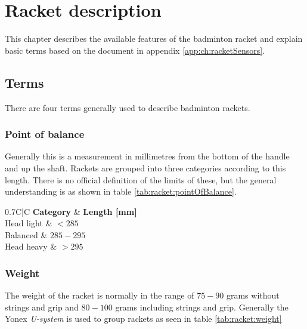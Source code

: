 \chapter{Racket description}
This chapter describes the available features of the badminton racket and explain basic terms based on the document in appendix \ref{app:ch:racketSensors}.

\section{Terms}
There are four terms generally used to describe badminton rackets.

\subsection*{Point of balance}
Generally this is a measurement in millimetres from the bottom of the handle and up the shaft.
Rackets are grouped into three categories according to this length.
There is no official definition of the limits of these, but the general understanding is as shown in table \ref{tab:racket:pointOfBalance}.

\begin{table}
	\begin{center}
		\begin{tabularx}{0.7\textwidth}{C|C}
			\textbf{Category} & \textbf{Length [mm]} \\
			\hline
			Head light        & $< 285$                \\
			Balanced          & $285-295$              \\
			Head heavy        & $>295$                 \\
		\end{tabularx}
	\end{center}
    \caption{Categorization of a racket's point of balance}
    \label{tab:racket:pointOfBalance}
\end{table}

\subsection*{Weight}
The weight of the racket is normally in the range of $75-90$ grams without strings and grip and $80-100$ grams including strings and grip.
Generally the Yonex \textit{U-system} is used to group rackets as seen in table \ref{tab:racket:weight}


